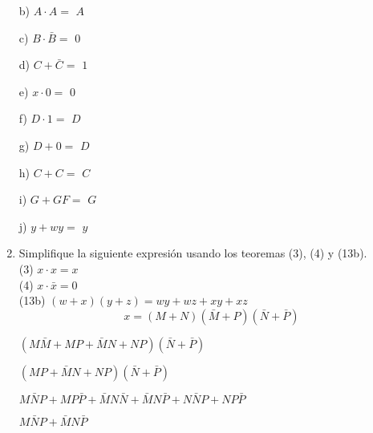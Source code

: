 \documentclass[a4paper, 12pt]{article}
\newcommand{\Aspace}{0.2cm}
\begin{document}
\begin{enumerate}
            \vspace{\Aspace} \par
            b) $A \cdot A = $
            { \color{azul} $A$ }

            \vspace{\Aspace} \par
            c) $B \cdot \bar{B} = $
            { \color{azul} $0$ }

            \vspace{\Aspace} \par
            d) $C + \bar{C} = $
            { \color{azul} $1$ }

            \vspace{\Aspace} \par
            e) $x \cdot 0 = $
            { \color{azul} $0$ }

            \vspace{\Aspace} \par
            f) $D \cdot 1 = $
            { \color{azul} $D$ }

            \vspace{\Aspace} \par
            g) $D + 0 = $
            { \color{azul} $D$ }

            \vspace{\Aspace} \par
            h) $C + C = $
            { \color{azul} $C$ }

            \vspace{\Aspace} \par
            i) $G + GF = $
            { \color{azul} $G$ }

            \vspace{\Aspace} \par
            j) $y + wy = $
            { \color{azul} $y$ }



        \item Simplifique la siguiente expresión usando los teoremas (3), (4) y (13b).
        \\ (3) $x \cdot x = x$
        \\ (4) $x \cdot \bar{x} = 0$
        \\ (13b) $(w + x)(y + z) = wy + wz + xy + xz$
        \[ x = (M + N)(\bar{M} + P)(\bar{N} + \bar{P})\]
            \par
            { \color{azul} 
                        $(M\bar{M} + MP + \bar{M}N + NP)(\bar{N} + \bar{P})$
                \par    $(MP + \bar{M}N + NP)(\bar{N} + \bar{P})$
                \par    $M\bar{N}P + MP\bar{P} + \bar{M}N\bar{N} + \bar{M}N\bar{P} + N\bar{N}P + NP\bar{P}$
                \par    $M\bar{N}P + \bar{M}N\bar{P}$
            }



\end{enumerate}
\end{document}
